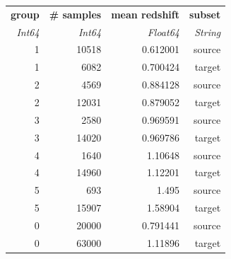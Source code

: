 \begin{tabular}{|r|r|r|r|}
  \hline
  \textbf{group} & \textbf{\# samples} & \textbf{mean redshift} & \textbf{subset} \\
  \textit{Int64} & \textit{Int64} & \textit{Float64} & \textit{String} \\
  \hline
  1 & 10518 & 0.612001 & source \\
  1 & 6082 & 0.700424 & target \\
  2 & 4569 & 0.884128 & source \\
  2 & 12031 & 0.879052 & target \\
  3 & 2580 & 0.969591 & source \\
  3 & 14020 & 0.969786 & target \\
  4 & 1640 & 1.10648 & source \\
  4 & 14960 & 1.12201 & target \\
  5 & 693 & 1.495 & source \\
  5 & 15907 & 1.58904 & target \\
  0 & 20000 & 0.791441 & source \\
  0 & 63000 & 1.11896 & target \\
  \hline
\end{tabular}

